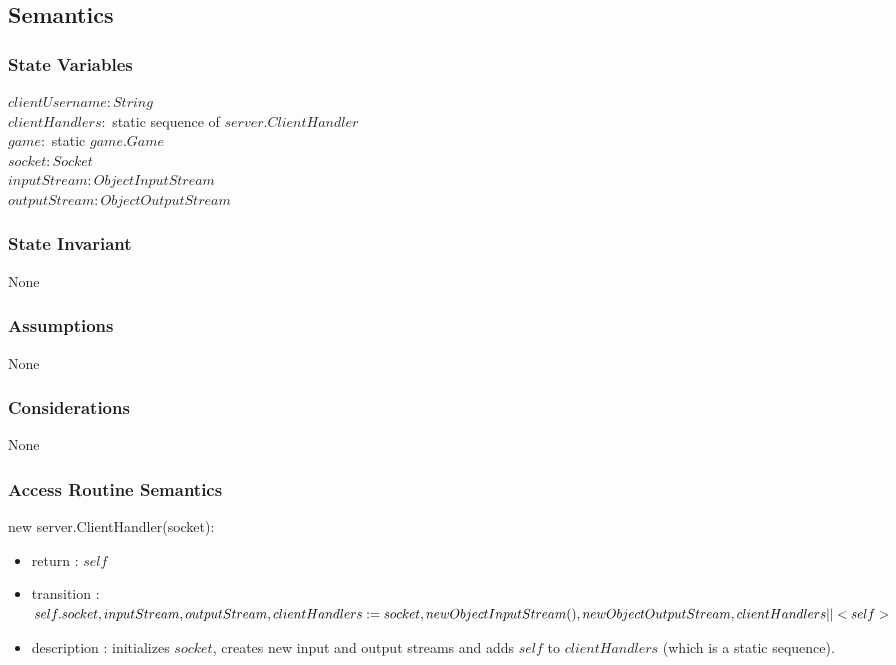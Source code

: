 \documentclass[12pt, titlepage]{article}
\begin{document}
    \subsection* {Semantics}
    
    \subsubsection* {State Variables}
        $\mathit{clientUsername}: String$\\
        $\mathit{clientHandlers}:$ static sequence of $server.ClientHandler$\\
        $\mathit{game}:$ static $game.Game$\\
        $\mathit{socket}: Socket$\\
        $\mathit{inputStream}: ObjectInputStream$\\
        $\mathit{outputStream} : ObjectOutputStream$\\

    \subsubsection* {State Invariant}
        None
    
    \subsubsection* {Assumptions}
        None
    
    \subsubsection* {Considerations}
        None
    
    \subsubsection* {Access Routine Semantics}
    
        \noindent new server.ClientHandler(socket):
        \begin{itemize}
        \item return : $self$
        \item transition : $self.socket, inputStream, outputStream, clientHandlers := \\
        socket, new ObjectInputStream(), new ObjectOutputStream, clientHandlers || <self>$
        \item description : initializes $socket$, creates new input and output streams and adds $self$ to $clientHandlers$ (which is a static sequence).
        \end{itemize}
        
\end{document}
